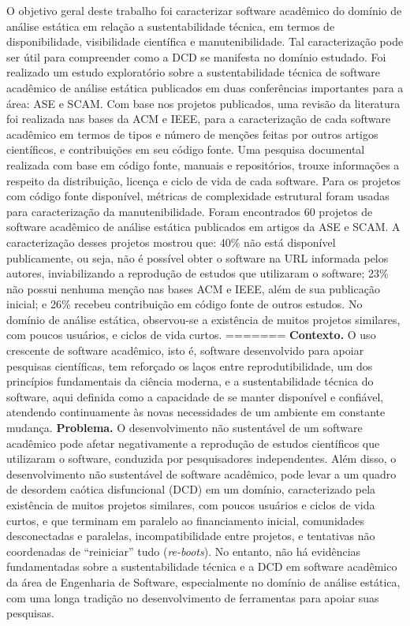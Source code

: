 O objetivo geral deste trabalho foi 
caracterizar software acadêmico do domínio de análise estática 
em relação a sustentabilidade técnica, 
em termos de disponibilidade, visibilidade científica e manutenibilidade.
Tal caracterização pode ser útil para compreender como a DCD se manifesta
no domínio estudado.
%
Foi realizado um estudo exploratório sobre a sustentabilidade
técnica de software acadêmico de análise estática 
publicados em duas conferências importantes para a área: ASE e SCAM.
%
Com base nos projetos publicados,  %
uma revisão da literatura foi realizada nas bases da ACM e IEEE, 
para a caracterização de cada software acadêmico 
em termos de tipos e número de menções feitas por outros artigos científicos,
e contribuições em seu código fonte.
Uma pesquisa documental realizada com base em 
código fonte, manuais e repositórios, trouxe informações a respeito da
distribuição, licença e ciclo de vida de cada software.
Para os projetos com código fonte disponível, métricas de
complexidade estrutural foram usadas para caracterização da manutenibilidade.
%
Foram encontrados 60 projetos de software acadêmico de análise estática
publicados em artigos da ASE e SCAM.
%
A caracterização desses projetos mostrou que: 
40\% não está disponível publicamente, ou seja, 
não é possível obter o software na URL informada pelos autores, 
inviabilizando a reprodução de estudos que utilizaram o software;
%
23\% não possui nenhuma menção nas bases ACM e IEEE, além de sua publicação inicial; e
26\% recebeu contribuição em código fonte de outros estudos.
No domínio de análise estática, observou-se a existência de muitos projetos similares, com poucos usuários, e ciclos de vida curtos.
%
=======
\textbf{Contexto.}
O uso crescente de software acadêmico, isto é,
software desenvolvido para apoiar pesquisas científicas,
tem reforçado os laços entre
reprodutibilidade, um dos princípios fundamentais da ciência moderna,
e a sustentabilidade técnica do software,
aqui definida como a capacidade de se manter disponível e confiável,
atendendo continuamente às novas necessidades de um ambiente em constante
mudança.
%
\textbf{Problema.}
O desenvolvimento não sustentável de um software acadêmico pode
afetar negativamente a reprodução de estudos científicos que utilizaram o
software,
conduzida por pesquisadores independentes.
Além disso, o desenvolvimento não sustentável de software acadêmico,
pode levar a um quadro de desordem caótica disfuncional (DCD) em um domínio,
caracterizado pela existência de muitos projetos similares, com poucos
usuários e ciclos de vida curtos, e que terminam em paralelo ao
financiamento
inicial,  comunidades desconectadas e paralelas, incompatibilidade entre
projetos, e tentativas não coordenadas de ``reiniciar'' tudo
({\it re-boots}).
%
No entanto, não há evidências fundamentadas sobre a sustentabilidade técnica
e a DCD em software acadêmico da área de Engenharia de Software,
especialmente
no domínio de análise estática, com uma longa tradição no
desenvolvimento de ferramentas para apoiar suas pesquisas.

